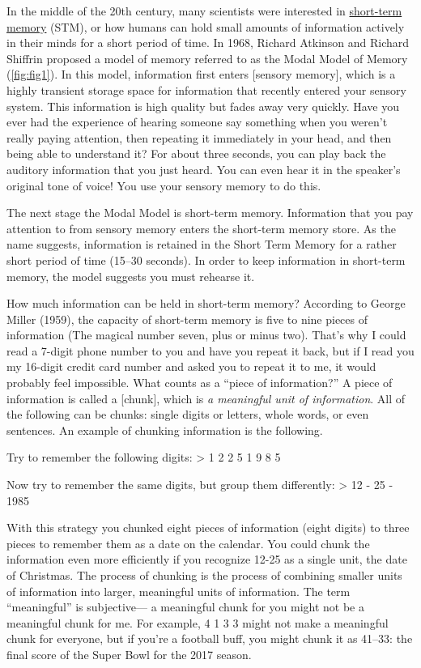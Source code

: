 \documentclass[
]{krantz}
\begin{document}
In the middle of the 20th century, many scientists were interested in \protect\hyperlink{short-term-memory}{short-term memory} (STM), or how humans can hold small amounts of information actively in their minds for a short period of time. In 1968, Richard Atkinson and Richard Shiffrin proposed a model of memory referred to as the Modal Model of Memory (\ref{fig:fig1}). In this model, information first enters {[}sensory memory{]}, which is a highly transient storage space for information that recently entered your sensory system. This information is high quality but fades away very quickly. Have you ever had the experience of hearing someone say something when you weren't really paying attention, then repeating it immediately in your head, and then being able to understand it? For about three seconds, you can play back the auditory information that you just heard. You can even hear it in the speaker's original tone of voice! You use your sensory memory to do this.

The next stage the Modal Model is short-term memory. Information that you pay attention to from sensory memory enters the short-term memory store. As the name suggests, information is retained in the Short Term Memory for a rather short period of time (15--30 seconds). In order to keep information in short-term memory, the model suggests you must rehearse it.

How much information can be held in short-term memory? According to George Miller (1959), the capacity of short-term memory is five to nine pieces of information (The magical number seven, plus or minus two). That's why I could read a 7-digit phone number to you and have you repeat it back, but if I read you my 16-digit credit card number and asked you to repeat it to me, it would probably feel impossible. What counts as a ``piece of information?'' A piece of information is called a {[}chunk{]}, which is \emph{a meaningful unit of information}. All of the following can be chunks: single digits or letters, whole words, or even sentences. An example of chunking information is the following.

Try to remember the following digits:
\textgreater{} 1 2 2 5 1 9 8 5

Now try to remember the same digits, but group them differently:
\textgreater{} 12 - 25 - 1985

With this strategy you chunked eight pieces of information (eight digits) to three pieces to remember them as a date on the calendar. You could chunk the information even more efficiently if you recognize 12-25 as a single unit, the date of Christmas. The process of chunking is the process of combining smaller units of information into larger, meaningful units of information. The term ``meaningful'' is subjective--- a meaningful chunk for you might not be a meaningful chunk for me. For example, 4 1 3 3 might not make a meaningful chunk for everyone, but if you're a football buff, you might chunk it as 41--33: the final score of the Super Bowl for the 2017 season.
\end{document}
